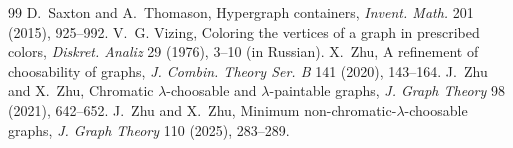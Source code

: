 \documentclass[10pt,a4paper]{amsart}
\numberwithin{equation}{section}
\begin{document}
\begin{thebibliography}{99}
 D.~Saxton and A.~Thomason, \newblock Hypergraph containers, \newblock \emph{Invent. Math.} 201 (2015), 925--992.
 V.~G. Vizing, \newblock Coloring the vertices of a graph in prescribed colors, \newblock \emph{Diskret. Analiz} 29 (1976), 3--10 (in Russian).
 X.~Zhu, \newblock A refinement of choosability of graphs, \newblock \emph{J. Combin. Theory Ser. B} 141 (2020), 143--164.
 J.~Zhu and X.~Zhu, \newblock Chromatic $\lambda$-choosable and $\lambda$-paintable graphs, \newblock \emph{J. Graph Theory} 98 (2021), 642--652.
 J.~Zhu and X.~Zhu, \newblock Minimum non-chromatic-$\lambda$-choosable graphs, \newblock \emph{J. Graph Theory} 110 (2025), 283--289.
\end{thebibliography}
\end{document}
